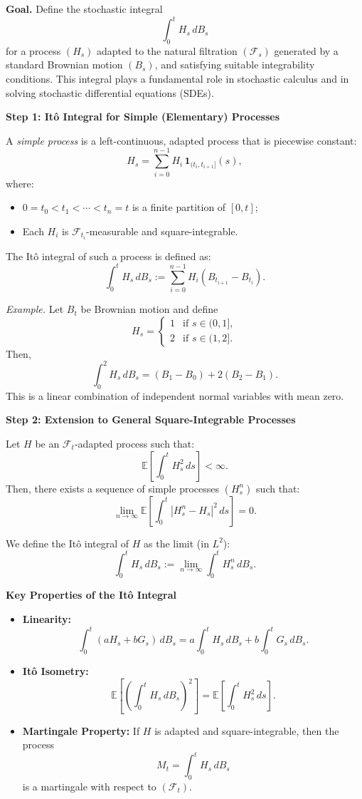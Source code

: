 
\textbf{Goal.}  
Define the stochastic integral
\[
\int_0^t H_s \, dB_s
\]
for a process \( (H_s) \) adapted to the natural filtration \( (\mathcal{F}_s) \) generated by a standard Brownian motion \( (B_s) \), and satisfying suitable integrability conditions. This integral plays a fundamental role in stochastic calculus and in solving stochastic differential equations (SDEs).

\vspace{1em}
\textbf{Step 1: Itô Integral for Simple (Elementary) Processes}  

A \textit{simple process} is a left-continuous, adapted process that is piecewise constant:
\[
H_s = \sum_{i=0}^{n-1} H_i \, \mathbf{1}_{(t_i, t_{i+1}]}(s),
\]
where:
\begin{itemize}
  \item \( 0 = t_0 < t_1 < \cdots < t_n = t \) is a finite partition of \([0, t]\);
  \item Each \( H_i \) is \( \mathcal{F}_{t_i} \)-measurable and square-integrable.
\end{itemize}

The Itô integral of such a process is defined as:
\[
\int_0^t H_s \, dB_s := \sum_{i=0}^{n-1} H_i \left( B_{t_{i+1}} - B_{t_i} \right).
\]

\textit{Example.}  
Let \( B_t \) be Brownian motion and define
\[
H_s = \begin{cases}
1 & \text{if } s \in (0,1], \\
2 & \text{if } s \in (1,2].
\end{cases}
\]
Then,
\[
\int_0^2 H_s \, dB_s = (B_1 - B_0) + 2(B_2 - B_1).
\]
This is a linear combination of independent normal variables with mean zero.

\vspace{1em}
\textbf{Step 2: Extension to General Square-Integrable Processes}  

Let \( H \) be an \( \mathcal{F}_t \)-adapted process such that:
\[
\mathbb{E} \left[ \int_0^t H_s^2 \, ds \right] < \infty.
\]
Then, there exists a sequence of simple processes \( (H^n_s) \) such that:
\[
\lim_{n \to \infty} \mathbb{E} \left[ \int_0^t |H^n_s - H_s|^2 \, ds \right] = 0.
\]

We define the Itô integral of \( H \) as the limit (in \( L^2 \)):
\[
\int_0^t H_s \, dB_s := \lim_{n \to \infty} \int_0^t H^n_s \, dB_s.
\]

\vspace{1em}
\textbf{Key Properties of the Itô Integral}
\begin{itemize}
  \item \textbf{Linearity:} 
  \[
  \int_0^t (a H_s + b G_s) \, dB_s = a \int_0^t H_s \, dB_s + b \int_0^t G_s \, dB_s.
  \]
  \item \textbf{Itô Isometry:}
  \[
  \mathbb{E} \left[ \left( \int_0^t H_s \, dB_s \right)^2 \right] = \mathbb{E} \left[ \int_0^t H_s^2 \, ds \right].
  \]
  \item \textbf{Martingale Property:}  
  If \( H \) is adapted and square-integrable, then the process
  \[
  M_t = \int_0^t H_s \, dB_s
  \]
  is a martingale with respect to \( (\mathcal{F}_t) \).
\end{itemize}

